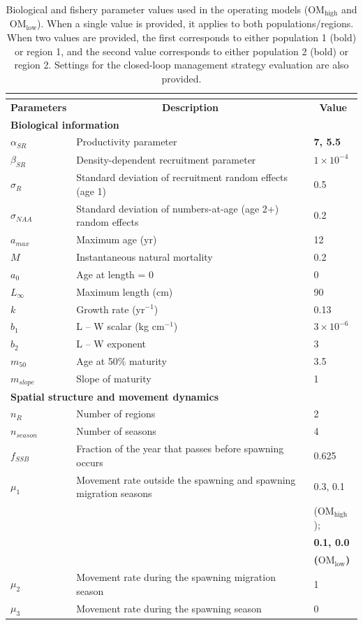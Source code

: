 \begin{center}
\begin{longtable}{p{2cm} p{10cm} p{3cm}}
\caption{Biological and fishery parameter values used in the operating models ($\text{OM}_{\text{high}}$ and $\text{OM}_{\text{low}}$). When a single value is provided, it applies to both populations/regions. When two values are provided, the first corresponds to either population 1 (bold) or region 1, and the second value corresponds to either population 2 (bold) or region 2. Settings for the closed-loop management strategy evaluation are also provided.} \\
\label{para_tab} \\
\hline
\multicolumn{1}{c}{\textbf{Parameters}} & \multicolumn{1}{c}{\textbf{Description}} & \multicolumn{1}{c}{\textbf{Value}} \tabularnewline
\hline

\multicolumn{3}{l}{\textbf{Biological information}} \tabularnewline
$\alpha_{SR}$ & Productivity parameter & \textbf{7, 5.5} \tabularnewline
$\beta_{SR}$ & Density-dependent recruitment parameter & $1 \times 10^{-4}$ \tabularnewline
$\sigma_R$ & Standard deviation of recruitment random effects (age 1) & 0.5 \tabularnewline
$\sigma_{NAA}$ & Standard deviation of numbers-at-age (age 2+) random effects & 0.2 \tabularnewline
$a_{max}$ & Maximum age (yr) & 12 \tabularnewline
$M$ & Instantaneous natural mortality & 0.2 \tabularnewline
$a_0$ & Age at length = 0 & 0 \tabularnewline
$L_\infty$ & Maximum length (cm) & 90 \tabularnewline
$k$ & Growth rate (yr$^{-1}$) & 0.13 \tabularnewline
$b_1$ & L – W scalar (kg cm$^{-1}$) & $3 \times 10^{-6}$ \tabularnewline
$b_2$ & L – W exponent & 3 \tabularnewline
$m_{50}$ & Age at 50\% maturity & 3.5 \tabularnewline
$m_{slope}$ & Slope of maturity & 1 \tabularnewline

\multicolumn{3}{l}{\textbf{Spatial structure and movement dynamics}} \tabularnewline
$n_{R}$ & Number of regions & 2 \tabularnewline
$n_{season}$ & Number of seasons & 4 \tabularnewline
$f_{SSB}$ & Fraction of the year that passes before spawning occurs & 0.625 \tabularnewline
$\mu_1$ & Movement rate outside the spawning and spawning migration seasons & {0.3, 0.1} \\ & & ($\text{OM}_{\text{high}}$); \\ & & \textbf{0.1, 0.0} \\ & & \textbf{($\text{OM}_{\text{low}}$)} \tabularnewline
$\mu_2$ & Movement rate during the spawning migration season & 1 \tabularnewline
$\mu_3$ & Movement rate during the spawning season & 0 \tabularnewline


\end{longtable}
\end{center}
